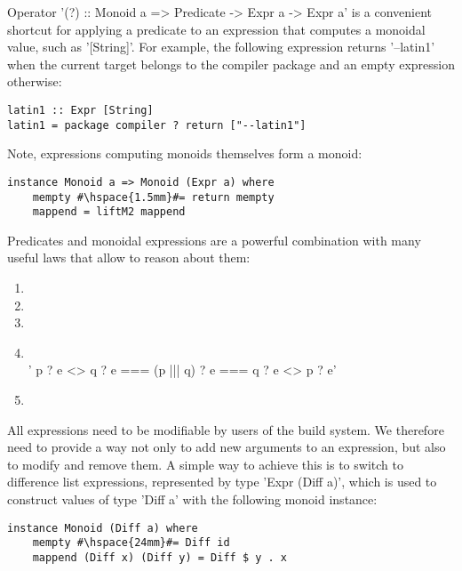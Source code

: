 Operator \lst'(?) :: Monoid a => Predicate -> Expr a -> Expr a' is a
convenient shortcut for applying a predicate to an expression that computes a monoidal value, such
as \lst'[String]'. For example, the following expression returns
\lst'--latin1' when the current target belongs to the compiler package and an
empty expression otherwise:

\begin{lstlisting}
latin1 :: Expr [String]
latin1 = package compiler ? return ["--latin1"]
\end{lstlisting}

\noindent Note, expressions computing monoids themselves form a monoid:

\begin{lstlisting}
instance Monoid a => Monoid (Expr a) where
    mempty #\hspace{1.5mm}#= return mempty
    mappend = liftM2 mappend
\end{lstlisting}

Predicates and monoidal expressions are a powerful combination with many useful
laws that allow to reason about them:
\begin{enumerate}
  \item {} 
  \item {} 
  \item {} 
  \item {}  \vspace{1mm}\\
  \lst'    p ? e <> q ? e === (p ||| q) ? e === q ? e <> p ? e'
  \item {} 
\end{enumerate}

All expressions need to be modifiable by users of the build system. We therefore
need to provide a way not only to add new arguments to an expression, but also
to modify and remove them. A simple way to achieve this is to switch to difference
list expressions, represented by type \lst'Expr (Diff a)', which is used to
construct values of type \lst'Diff a' with the following monoid instance:

\begin{lstlisting}
instance Monoid (Diff a) where
    mempty #\hspace{24mm}#= Diff id
    mappend (Diff x) (Diff y) = Diff $ y . x
\end{lstlisting}

